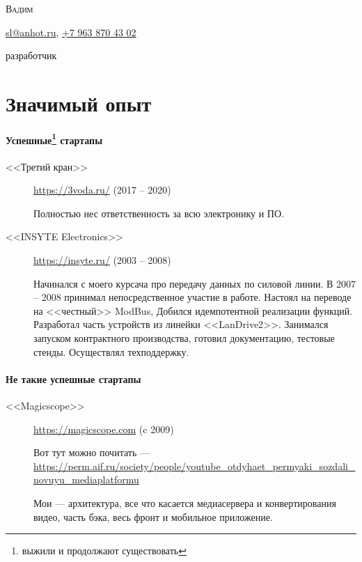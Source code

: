 \documentclass [a4paper,10pt]{article}
\begin{document}
\begin{center}
{\scshape\LARGE Вадим \par}
\Letter\hspace{6pt}\href{mailto:sl@anhot.ru}{sl@anhot.ru},
\Mobilefone\hspace{6pt}\href{tel:+79638704302}{+7 963 870 43 02}

разработчик
\end{center}
\section*{Значимый опыт}
\paragraph{Успешные\protect\footnote{выжили и продолжают существовать} стартапы}
\begin{description}
\item[<<Третий кран>>] \url{https://3voda.ru/} (2017 -- 2020) 

Полностью нес ответственность за всю электронику и ПО.

\item[<<INSYTE Electronics>>] \url{https://insyte.ru/} (2003 -- 2008)

Начинался с моего курсача про передачу данных по силовой линии. В 2007 -- 2008 принимал непосредственное участие в работе.
Настоял на переводе на <<честный>> ModBus, Добился идемпотентной реализации функций. Разработал часть устройств из линейки <<LanDrive2>>.
Занимался запуском контрактного производства, готовил документацию, тестовые стенды. Осуществлял техподдержку.
\end{description}

\paragraph{Не такие успешные стартапы}
\begin{description}
\item[<<Magicscope>>] \url{https://magicscope.com} (c 2009)

Вот тут можно почитать --- \url{https://perm.aif.ru/society/people/youtube_otdyhaet_permyaki_sozdali_novuyu_mediaplatformu}
	
Мои --- архитектура, все что касается медиасервера и конвертирования видео, часть бэка, весь фронт и мобильное приложение.
\end{description}
\end{document}
